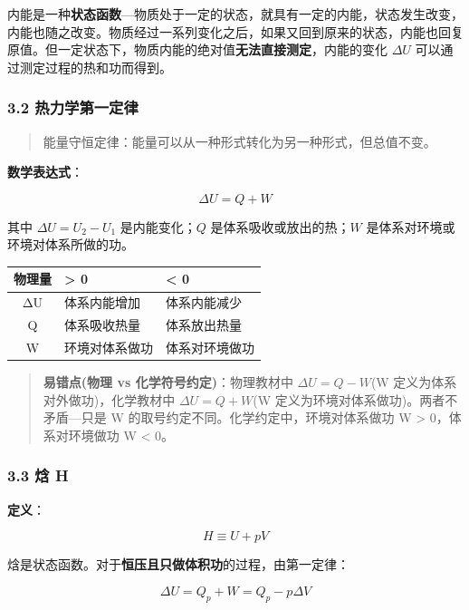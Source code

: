 内能是一种\textbf{状态函数}---物质处于一定的状态，就具有一定的内能，状态发生改变，内能也随之改变。物质经过一系列变化之后，如果又回到原来的状态，内能也回复原值。但一定状态下，物质内能的绝对值\textbf{无法直接测定}，内能的变化 \(\Delta U\) 可以通过测定过程的热和功而得到。

\subsubsection{3.2 热力学第一定律}\label{ux70edux529bux5b66ux7b2cux4e00ux5b9aux5f8b}

\begin{quote}
能量守恒定律：能量可以从一种形式转化为另一种形式，但总值不变。
\end{quote}

\textbf{数学表达式}：

\[
\Delta U = Q + W
\]

其中 \(\Delta U = U_2 - U_1\) 是内能变化；\(Q\) 是体系吸收或放出的热；\(W\) 是体系对环境或环境对体系所做的功。

{\def\LTcaptype{none} %
\begin{longtable}[]{@{}cll@{}}
\toprule\noalign{}
物理量 & \textgreater{} 0 & \textless{} 0 \\
\midrule\noalign{}
\endhead
\bottomrule\noalign{}
\endlastfoot
ΔU & 体系内能增加 & 体系内能减少 \\
Q & 体系吸收热量 & 体系放出热量 \\
W & 环境对体系做功 & 体系对环境做功 \\
\end{longtable}
}

\begin{quote}
\textbf{易错点(物理 vs 化学符号约定)}：物理教材中 \(\Delta U = Q - W\)(W 定义为体系对外做功)，化学教材中 \(\Delta U = Q + W\)(W 定义为环境对体系做功)。两者不矛盾---只是 W 的取号约定不同。化学约定中，环境对体系做功 W \textgreater{} 0，体系对环境做功 W \textless{} 0。
\end{quote}

\subsubsection{3.3 焓 H}\label{ux7113-h}

\textbf{定义}：

\[
H \equiv U + pV
\]

焓是状态函数。对于\textbf{恒压且只做体积功}的过程，由第一定律：

\[
\Delta U = Q_p + W = Q_p - p\Delta V
\]

